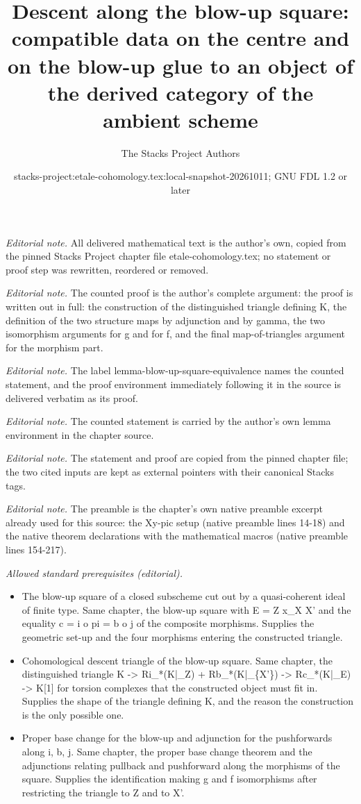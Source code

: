 \documentclass[10pt,a4paper]{amsart}
\title{Descent along the blow-up square: compatible data on the centre and on the blow-up glue to an object of the derived category of the ambient scheme}
\author{The Stacks Project Authors}
\date{stacks-project:etale-cohomology.tex:local-snapshot-20261011; GNU FDL 1.2 or later}
\theoremstyle{plain}
\theoremstyle{definition}
\theoremstyle{remark}
\numberwithin{equation}{subsection}
\begin{document}
\maketitle
\noindent\textit{Editorial note.} All delivered mathematical text is the author's own, copied from the pinned Stacks Project chapter file etale-cohomology.tex; no statement or proof step was rewritten, reordered or removed.\par\medskip
\noindent\textit{Editorial note.} The counted proof is the author's complete argument: the proof is written out in full: the construction of the distinguished triangle defining K, the definition of the two structure maps by adjunction and by gamma, the two isomorphism arguments for g and for f, and the final map-of-triangles argument for the morphism part.\par\medskip
\noindent\textit{Editorial note.} The label lemma-blow-up-square-equivalence names the counted statement, and the proof environment immediately following it in the source is delivered verbatim as its proof.\par\medskip
\noindent\textit{Editorial note.} The counted statement is carried by the author's own lemma environment in the chapter source.\par\medskip
\noindent\textit{Editorial note.} The statement and proof are copied from the pinned chapter file; the two cited inputs are kept as external pointers with their canonical Stacks tags.\par\medskip
\noindent\textit{Editorial note.} The preamble is the chapter's own native preamble excerpt already used for this source: the Xy-pic setup (native preamble lines 14-18) and the native theorem declarations with the mathematical macros (native preamble lines 154-217).\par\medskip
\noindent\textit{Allowed standard prerequisites (editorial).}\begin{itemize}
\item The blow-up square of a closed subscheme cut out by a quasi-coherent ideal of finite type. Same chapter, the blow-up square with E = Z x\_X X' and the equality c = i o pi = b o j of the composite morphisms. Supplies the geometric set-up and the four morphisms entering the constructed triangle.
\item Cohomological descent triangle of the blow-up square. Same chapter, the distinguished triangle K -> Ri\_*(K|\_Z) + Rb\_*(K|\_\{X'\}) -> Rc\_*(K|\_E) -> K[1] for torsion complexes that the constructed object must fit in. Supplies the shape of the triangle defining K, and the reason the construction is the only possible one.
\item Proper base change for the blow-up and adjunction for the pushforwards along i, b, j. Same chapter, the proper base change theorem and the adjunctions relating pullback and pushforward along the morphisms of the square. Supplies the identification making g and f isomorphisms after restricting the triangle to Z and to X'.
\end{itemize}\medskip
\end{document}
